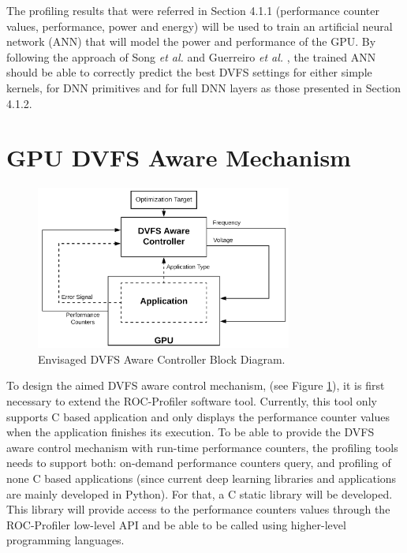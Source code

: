 The profiling results that were referred in Section 4.1.1 (performance counter values, performance, power and energy) will be used to train an artificial neural network (ANN) that will model the power and performance of the GPU. By following the approach of Song \textit{et al.} \cite{song_simplified_2013} and Guerreiro  \textit{et al.} \cite{guerreiro_modeling_2019}, the trained ANN should be able to correctly predict the best DVFS settings for either simple kernels, for DNN primitives and for full DNN layers as those presented in Section 4.1.2.

\section{GPU DVFS Aware Mechanism}
\label{section:DVFSaware}

\begin{figure}[!htb]
  \centering
  \includegraphics[width=0.75\textwidth]{Figures/Proposel/DVFS_Aware_Controller.png}
  \caption[Controller]{Envisaged DVFS Aware Controller Block Diagram.}
  \label{fig:controlerDVFSaware}
\end{figure}

To design the aimed DVFS aware control mechanism, (see Figure \ref{fig:controlerDVFSaware}), it is first necessary to extend the ROC-Profiler \cite{noauthor_rocm-developer-tools/rocprofiler_2019} software tool. Currently, this tool only supports C based application and only displays the performance counter values when the application finishes its execution. To be able to provide the DVFS aware control mechanism with run-time performance counters,  the profiling tools needs to support both: on-demand performance counters query, and profiling of none C based applications (since current deep learning libraries and applications are mainly developed in Python). For that, a C static library will be developed. This library will provide access to the performance counters values through the ROC-Profiler low-level API and be able to be called using higher-level programming languages.

